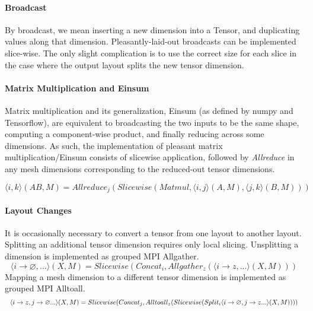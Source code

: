 \documentclass{article}
\def \O {\varnothing}
\begin{document}
\begin{itemize}
\paragraph{Broadcast}
By broadcast, we mean inserting a new dimension into a Tensor, and duplicating values along that dimension.  Pleasantly-laid-out broadcasts can be implemented slice-wise.  The only slight complication is to use the correct size for each slice in the case where the output layout splits the new tensor dimension.

\paragraph{Matrix Multiplication and Einsum} 

Matrix multiplication and its generalization, Einsum (as defined by numpy and Tensorflow), are equivalent to broadcasting the two inputs to be the same shape, computing a component-wise product, and finally reducing across some dimensions.  As such, the implementation of pleasant matrix multiplication/Einsum consists of slicewise application, followed by \textit{Allreduce} in any mesh dimensions corresponding to the reduced-out tensor dimensions.



\begin{equation}
    \langle i, k \rangle(AB, M)
    = Allreduce_j(Slicewise(Matmul, \langle i, j \rangle(A, M), \langle j, k \rangle(B, M)))
\end{equation}



\paragraph{Layout Changes}
It is occasionally necessary to convert a tensor from one layout to another layout.  Splitting an additional tensor dimension requires only local slicing.  Unsplitting a dimension is implemented as grouped MPI Allgather.
\begin{equation}
    \langle i \rightarrow \O, ... \rangle(X, M) =
    Slicewise(Concat_i, Allgather_z(\langle i \rightarrow z, ... \rangle(X, M)))
\end{equation}
Mapping a mesh dimension to a different tensor dimension is implemented as grouped MPI Alltoall.
\begin{equation}
    \scalebox{0.8}{$\langle i \rightarrow z, j \rightarrow \O... \rangle(X, M) = Slicewise(Concat_j, Alltoall_{z}(Slicewise(Split_i \langle i \rightarrow \O, j \rightarrow z ... \rangle(X, M))))$}
\end{equation}


\end{itemize}
\end{document}
